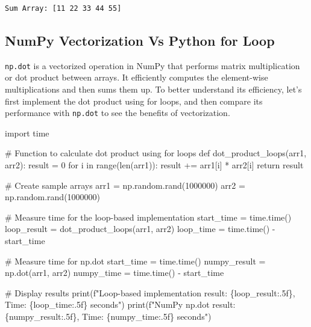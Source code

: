 \documentclass[
  letterpaper,
  DIV=11,
  numbers=noendperiod]{scrreprt}
\newenvironment{Shaded}{\begin{snugshade}}{\end{snugshade}}
\newcommand{\BuiltInTok}[1]{\textcolor[rgb]{0.00,0.23,0.31}{#1}}
\newcommand{\CommentTok}[1]{\textcolor[rgb]{0.37,0.37,0.37}{#1}}
\newcommand{\ControlFlowTok}[1]{\textcolor[rgb]{0.00,0.23,0.31}{#1}}
\newcommand{\DecValTok}[1]{\textcolor[rgb]{0.68,0.00,0.00}{#1}}
\newcommand{\ImportTok}[1]{\textcolor[rgb]{0.00,0.46,0.62}{#1}}
\newcommand{\KeywordTok}[1]{\textcolor[rgb]{0.00,0.23,0.31}{#1}}
\newcommand{\NormalTok}[1]{\textcolor[rgb]{0.00,0.23,0.31}{#1}}
\newcommand{\OperatorTok}[1]{\textcolor[rgb]{0.37,0.37,0.37}{#1}}
\newcommand{\SpecialCharTok}[1]{\textcolor[rgb]{0.37,0.37,0.37}{#1}}
\newcommand{\SpecialStringTok}[1]{\textcolor[rgb]{0.13,0.47,0.30}{#1}}
\begin{document}
\begin{verbatim}
Sum Array: [11 22 33 44 55]
\end{verbatim}

\hypertarget{numpy-vectorization-vs-python-for-loop}{%
\subsection{NumPy Vectorization Vs Python for
Loop}\label{numpy-vectorization-vs-python-for-loop}}

\texttt{np.dot} is a vectorized operation in NumPy that performs matrix
multiplication or dot product between arrays. It efficiently computes
the element-wise multiplications and then sums them up. To better
understand its efficiency, let's first implement the dot product using
for loops, and then compare its performance with \texttt{np.dot} to see
the benefits of vectorization.

\begin{Shaded}
\begin{Highlighting}[]
\ImportTok{import}\NormalTok{ time}

\CommentTok{\# Function to calculate dot product using for loops}
\KeywordTok{def}\NormalTok{ dot\_product\_loops(arr1, arr2):}
\NormalTok{    result }\OperatorTok{=} \DecValTok{0}
    \ControlFlowTok{for}\NormalTok{ i }\KeywordTok{in} \BuiltInTok{range}\NormalTok{(}\BuiltInTok{len}\NormalTok{(arr1)):}
\NormalTok{        result }\OperatorTok{+=}\NormalTok{ arr1[i] }\OperatorTok{*}\NormalTok{ arr2[i]}
    \ControlFlowTok{return}\NormalTok{ result}

\CommentTok{\# Create sample arrays}
\NormalTok{arr1 }\OperatorTok{=}\NormalTok{ np.random.rand(}\DecValTok{1000000}\NormalTok{)}
\NormalTok{arr2 }\OperatorTok{=}\NormalTok{ np.random.rand(}\DecValTok{1000000}\NormalTok{)}

\CommentTok{\# Measure time for the loop{-}based implementation}
\NormalTok{start\_time }\OperatorTok{=}\NormalTok{ time.time()}
\NormalTok{loop\_result }\OperatorTok{=}\NormalTok{ dot\_product\_loops(arr1, arr2)}
\NormalTok{loop\_time }\OperatorTok{=}\NormalTok{ time.time() }\OperatorTok{{-}}\NormalTok{ start\_time}

\CommentTok{\# Measure time for np.dot}
\NormalTok{start\_time }\OperatorTok{=}\NormalTok{ time.time()}
\NormalTok{numpy\_result }\OperatorTok{=}\NormalTok{ np.dot(arr1, arr2)}
\NormalTok{numpy\_time }\OperatorTok{=}\NormalTok{ time.time() }\OperatorTok{{-}}\NormalTok{ start\_time}

\CommentTok{\# Display results}
\BuiltInTok{print}\NormalTok{(}\SpecialStringTok{f"Loop{-}based implementation result: }\SpecialCharTok{\{}\NormalTok{loop\_result}\SpecialCharTok{:.5f\}}\SpecialStringTok{, Time: }\SpecialCharTok{\{}\NormalTok{loop\_time}\SpecialCharTok{:.5f\}}\SpecialStringTok{ seconds"}\NormalTok{)}
\BuiltInTok{print}\NormalTok{(}\SpecialStringTok{f"NumPy np.dot result: }\SpecialCharTok{\{}\NormalTok{numpy\_result}\SpecialCharTok{:.5f\}}\SpecialStringTok{, Time: }\SpecialCharTok{\{}\NormalTok{numpy\_time}\SpecialCharTok{:.5f\}}\SpecialStringTok{ seconds"}\NormalTok{)}
\end{Highlighting}
\end{Shaded}
\end{document}
